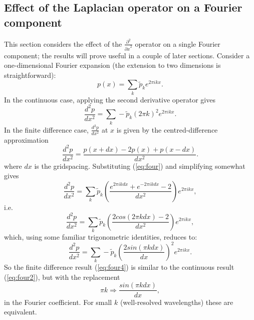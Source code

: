 \documentclass[11pt, a4paper,twoside]{article}
\newcommand{\ns}[2]{\frac{d^2 #1}{d #2^2}}
\newcommand{\ps}[2]{\frac{\partial^2 #1}{{\partial #2}^2}}
\numberwithin{equation}{section}
\begin{document}
\subsection{Effect of the Laplacian operator on a Fourier component}\label{sub:four}
This section considers the effect of the $\ps{}{x}$ operator on a single Fourier component; the results will prove useful in a couple of later sections.
Consider a one-dimensional Fourier expansion (the extension to two dimensions is straightforward):
\begin{equation}\label{eq:four}p(x) = \sum_k \tilde{p}_k e^{2\pi i k x}.
\end{equation}
In the continuous case, applying the second derivative operator gives
\begin{equation}\label{eq:four2}
\ns{p}{x} = \sum_k - \tilde{p}_k  (2\pi k)^2 e^{2\pi i k x}.
\end{equation}
In the finite difference case, $\ns{p}{x}$ at $x$ is given by the centred-difference approximation
\begin{equation}\label{eq:four3}
\ns{p}{x} = \frac{p(x+dx) - 2 p(x) + p(x-dx)}{dx^2}.
\end{equation}where $dx$ is the gridspacing.
Substituting (\ref{eq:four}) and simplifying somewhat gives\begin{equation}
\ns{p}{x} =\sum_k \tilde{p}_k  \left(\frac{e^{2\pi i k dx} + e^{-2\pi i k dx} -2}{dx^2}\right) e^{2\pi i k x},
\end{equation}
i.e.
\begin{equation}
\ns{p}{x} =\sum_k \tilde{p}_k  \left(\frac{2 cos(2\pi k dx) -2 } {dx^2}\right)e^{2\pi i k x},
\end{equation}
which, using some familiar trigonometric identities, reduces to:
\begin{equation}\label{eq:four4}
\ns{p}{x} =  \sum_k -\tilde{p}_k  \left(\frac{2 sin(\pi k dx) }{dx}\right)^2e^{2\pi i k x}.
\end{equation}
So the finite difference result (\ref{eq:four4}) is similar to the continuous result (\ref{eq:four2}), but with the replacement
\begin{equation}\label{eq:to}
\pi k \Rightarrow \frac{sin(\pi k dx)}{dx},
\end{equation}
in the Fourier coefficient.
For small $k$ (well-resolved wavelengths) these are equivalent.
\end{document}
